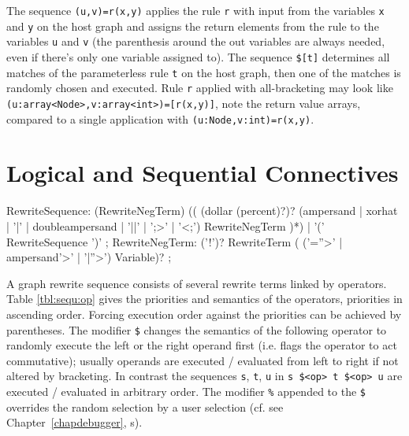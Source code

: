 \begin{example}
The sequence \verb#(u,v)=r(x,y)# applies the rule \texttt{r} with input from the variables \texttt{x} and \texttt{y} on the host graph 
and assigns the return elements from the rule to the variables \texttt{u} and \texttt{v} (the parenthesis around the out variables are always needed, even if there's only one variable assigned to).
The sequence \verb#$[t]# determines all matches of the parameterless rule \texttt{t} on the host graph, then one of the matches is randomly chosen and executed.
Rule \texttt{r} applied with all-bracketing may look like \verb#(u:array<Node>,v:array<int>)=[r(x,y)]#, note the return value arrays, compared to a single application with \verb#(u:Node,v:int)=r(x,y)#.
\end{example}


\section{Logical and Sequential Connectives}\label{sec:connectives}

\makeatletter

\begin{rail}
  RewriteSequence: 
    (RewriteNegTerm) (( (dollar (percent)?)? (ampersand | xorhat | '|' | doubleampersand | '||' | ';>' | '<;') RewriteNegTerm )*)
|    '(' RewriteSequence ')'
	;
  RewriteNegTerm: 
    ('!')? RewriteTerm ( ('=''>' | ampersand'>' | '|''>') Variable)?
	;
\end{rail}

A graph rewrite sequence consists of several rewrite terms linked by operators.
Table \ref{tbl:sequ:op} gives the priorities and semantics of the operators, priorities in ascending order.
Forcing execution order against the priorities can be achieved by parentheses.
The modifier \texttt{\$} changes the semantics of the following operator to randomly execute the left or the right operand first (i.e. flags the operator to act commutative);
usually operands are executed / evaluated from left to right if not altered by bracketing.
In contrast the sequences \texttt{s}, \texttt{t}, \texttt{u} in \texttt{s \$<op> t \$<op> u} are executed / evaluated in arbitrary order.
The modifier \texttt{\%} appended to the \texttt{\$} overrides the random selection by a user selection (cf. see Chapter~\ref{chapdebugger}, s).

